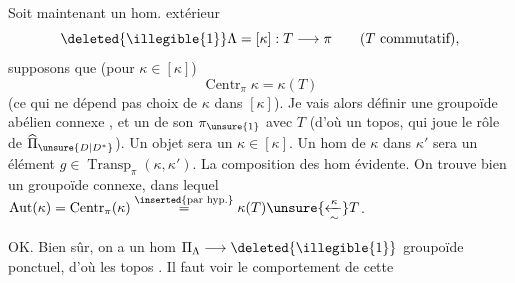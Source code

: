 Soit maintenant un hom. extérieur 
\[
\deleted{\illegible{1}}\Lambda=[\kappa]:T\longrightarrow\pi
\qquad (T\text{ commutatif}),
\]
supposons que (pour \(\kappa\in[\kappa]\))
\[
\operatorname{Centr}_\pi\kappa=\kappa(T)
\]
(ce qui ne dépend pas  choix de \(\kappa\) dans
\([\kappa]\)). Je vais alors définir une
 groupoïde abélien connexe \inserted{\(\Pi_\Lambda\)}, et un
 de son \(\pi_{\unsure{1}}\) avec \(T\) 
(d'où un topos, qui joue le rôle de
\(\widehat{\Pi}_{\unsure{D|D^*}}\)). Un objet sera un \(\kappa\in[\kappa]\).
Un hom de \(\kappa\) dans \(\kappa'\) sera un
élément \(g\in\operatorname{Transp}_\pi(\kappa,\kappa')\). 
La composition des hom évidente. On
trouve bien un groupoïde connexe, dans
lequel \(\operatorname{Aut}(\kappa)=\operatorname{Centr}_\pi(\kappa)\overset{\inserted{\text{par hyp.}}}{=}\kappa(T)\unsure{\xleftarrow[\sim]{\kappa}}T\).

OK. Bien sûr, on a un hom
\(\Pi_\Lambda\longrightarrow\deleted{\illegible{1}}\) groupoïde ponctuel, d'où
 les topos   .
Il faut voir le comportement de cette


